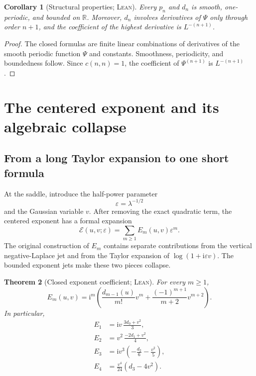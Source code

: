 \documentclass[11pt,oneside]{article}
\newtheorem{theorem}{Theorem}[section]
\newtheorem{corollary}[theorem]{Corollary}
\theoremstyle{definition}
\theoremstyle{remark}
\newcommand{\R}{\mathbb R}
\newcommand{\ii}{\mathrm i}
\newcommand{\Formalized}{\textsc{Lean}}
\begin{document}
\begin{corollary}[Structural properties; \Formalized]
\label{cor:jet-structure}
Every $p_n$ and $d_n$ is smooth, one-periodic, and bounded on $\R$.
Moreover, $d_n$ involves derivatives of $\Psi$ only through order $n+1$,
and the coefficient of the highest derivative is $L^{-(n+1)}$.
\end{corollary}

\begin{proof}
The closed formulas are finite linear combinations of derivatives of the
smooth periodic function $\Psi$ and constants.  Smoothness, periodicity,
and boundedness follow.  Since $c(n,n)=1$, the coefficient of
$\Psi^{(n+1)}$ is $L^{-(n+1)}$.
\end{proof}


\section{The centered exponent and its algebraic collapse}
\label{sec:centered-exponent}

\subsection{From a long Taylor expansion to one short formula}

At the saddle, introduce the half-power parameter
\[
 \varepsilon=\lambda^{-1/2}
\]
and the Gaussian variable $v$.  After removing the exact quadratic term,
the centered exponent has a formal expansion
\[
 \mathcal E(u,v;\varepsilon)
 =\sum_{m\geq1}E_m(u,v)\varepsilon^m.
\]
The original construction of $E_m$ contains separate contributions from
the vertical negative-Laplace jet and from the Taylor expansion of
$\log(1+\ii\varepsilon v)$.  The bounded exponent jets make these two
pieces collapse.

\begin{theorem}[Closed exponent coefficient; \Formalized]
\label{thm:closed-exponent}
For every $m\geq1$,
\begin{equation}
 E_m(u,v)=\ii^m\left(
   \frac{d_{m-1}(u)}{m!}v^m
   +\frac{(-1)^{m+1}}{m+2}v^{m+2}
 \right). \label{eq:E-closed}
\end{equation}
In particular,
\begin{align}
 E_1&=\ii v\,\frac{3d_0+v^2}{3}, \label{eq:E1}\\
 E_2&=v^2\,\frac{-2d_1+v^2}{4}, \label{eq:E2}\\
 E_3&=\ii v^3\left(-\frac{d_2}{6}-\frac{v^2}{5}\right), \label{eq:E3}\\
 E_4&=\frac{v^4}{24}(d_3-4v^2). \label{eq:E4}
\end{align}
\end{theorem}
\end{document}
